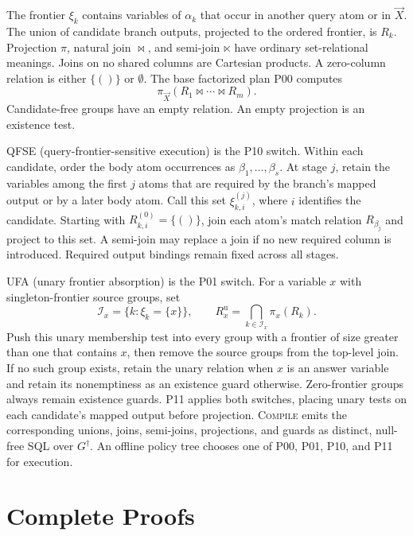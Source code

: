 \documentclass[conference]{IEEEtran}
\theoremstyle{definition}
\newcommand{\vect}[1]{\vec{#1}}
\newcommand{\Gc}{G^{\dagger}}
\newcommand{\QFSE}{\textsc{QFSE}}
\newcommand{\UFA}{\textsc{UFA}}
\newcommand{\FunctionName}[1]{\textsc{#1}}
\begin{document}
The frontier $\xi_k$ contains variables of $\alpha_k$ that occur in
another query atom or in $\vect{X}$. The union of candidate branch
outputs, projected to the ordered frontier, is $R_k$. Projection
$\pi$, natural join $\bowtie$, and semi-join $\ltimes$ have ordinary
set-relational meanings. Joins on no shared columns are Cartesian
products. A zero-column relation is either $\{()\}$ or $\emptyset$.
The base factorized plan P00 computes
\begin{equation}
\label{eq:factorized}
\pi_{\vect{X}}(R_1\bowtie\cdots\bowtie R_m).
\end{equation}
Candidate-free groups have an empty relation. An empty projection is
an existence test.

\QFSE{} (query-frontier-sensitive execution) is the P10 switch.
Within each candidate, order the body atom occurrences as
$\beta_1,\ldots,\beta_s$. At stage $j$, retain the variables among
the first $j$ atoms that are required by the branch's mapped output
or by a later body atom. Call this set $\xi_{k,i}^{(j)}$, where $i$
identifies the candidate. Starting with $R_{k,i}^{(0)}=\{()\}$,
join each atom's match relation $R_{\beta_j}$ and project to this
set. A semi-join may replace a join if no new required column is
introduced. Required output bindings remain fixed across all stages.

\UFA{} (unary frontier absorption) is the P01 switch. For a variable
$x$ with singleton-frontier source groups, set
\begin{equation}
\label{eq:unary}
\mathcal I_x=\{k:\xi_k=\{x\}\},\qquad
R_x^{\mathrm u}=\bigcap_{k\in\mathcal I_x}\pi_x(R_k).
\end{equation}
Push this unary membership test into every group with a frontier of
size greater than one that contains $x$, then remove the source
groups from the top-level join. If no such group exists, retain the
unary relation when $x$ is an answer variable and retain its
nonemptiness as an existence guard otherwise. Zero-frontier groups
always remain existence guards. P11 applies both switches, placing
unary tests on each candidate's mapped output before projection.
\FunctionName{Compile} emits the corresponding unions, joins,
semi-joins, projections, and guards as distinct, null-free SQL over
$\Gc$. An offline policy tree chooses one of P00, P01, P10, and P11
for execution.

\section{Complete Proofs}
\label{sec:proofs}
\end{document}

